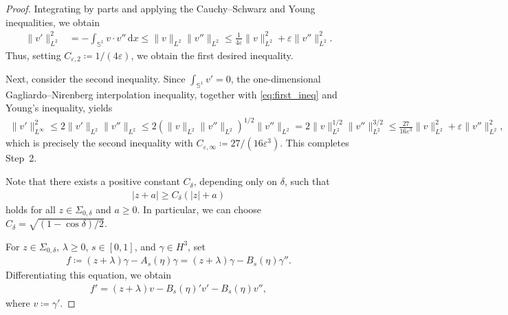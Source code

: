 \documentclass[10pt,a4paper]{amsart}
\begin{document}
\begin{proof}
Integrating by parts and applying the Cauchy--Schwarz and Young inequalities, we obtain
\begin{align}
    \|v'\|_{L^2}^2
    &=-\int_{\mathbb{S}^1}v\cdot v''\,\mathrm{d}x
    \le\|v\|_{L^2}\|v''\|_{L^2}
    \le\frac{1}{4\varepsilon}\|v\|_{L^2}^2 + \varepsilon\|v''\|_{L^2}^2.
    \label{eq:first_ineq}
\end{align}
Thus, setting $C_{\varepsilon,2}\coloneqq1/(4\varepsilon)$, we obtain the first desired inequality.

Next, consider the second inequality.
Since $\int_{\mathbb{S}^1}v'=0$, the one-dimensional Gagliardo--Nirenberg interpolation inequality, together with \eqref{eq:first_ineq} and Young's inequality, yields
\begin{align*}
    \|v'\|_{L^\infty}^2
    \le2\|v'\|_{L^2}\|v''\|_{L^2}
    \le2\left(\|v\|_{L^2}\|v''\|_{L^2}\right)^{1/2}\|v''\|_{L^2}
    =2\|v\|_{L^2}^{1/2}\|v''\|_{L^2}^{3/2}
    \le\frac{27}{16\varepsilon^3}\|v\|_{L^2}^2 + \varepsilon\|v''\|_{L^2}^2,
\end{align*}
which is precisely the second inequality with $C_{\varepsilon,\infty}\coloneqq27/(16\varepsilon^3)$. This completes Step~2.

Note that there exists a positive constant $C_\delta$, depending only on $\delta$, such that
\begin{align}
    |z+a|\ge C_\delta(|z|+a)
    \label{eq:abs_below}
\end{align}
holds for all $z\in\Sigma_{0,\delta}$ and $a\ge0$.
In particular, we can choose $C_\delta=\sqrt{(1-\cos\delta)/2}$.

For $z\in\Sigma_{0,\delta}$, $\lambda\ge0$, $s\in[0,1]$, and $\gamma\in H^3$, set
\begin{align*}
    f\coloneqq(z+\lambda)\gamma-A_s(\eta)\gamma=(z+\lambda)\gamma - B_s(\eta)\gamma''.
\end{align*}
Differentiating this equation, we obtain
\begin{align}
    f'=(z+\lambda)v - B_s(\eta)'v' - B_s(\eta)v'',
    \label{eq:f'}
\end{align}
where $v\coloneqq\gamma'$.


\end{proof}
\end{document}
